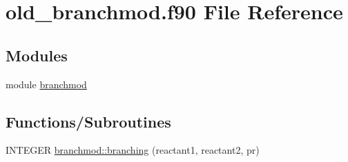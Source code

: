 \hypertarget{old__branchmod_8f90}{
\section{old\_\-branchmod.f90 File Reference}
\label{old__branchmod_8f90}
}
\subsection*{Modules}
\begin{DoxyCompactItemize}
\item 
module \hyperlink{namespacebranchmod}{branchmod}
\end{DoxyCompactItemize}
\subsection*{Functions/Subroutines}
\begin{DoxyCompactItemize}
\item 
INTEGER \hyperlink{namespacebranchmod_afe047e9cf349dd7beea43ce0113ab24b}{branchmod::branching} (reactant1, reactant2, pr)
\end{DoxyCompactItemize}
